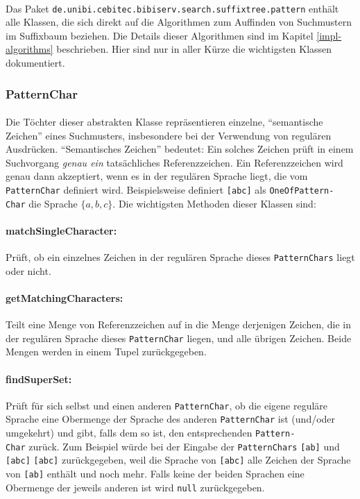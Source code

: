 \paragraph{} Das Paket \texttt{de.unibi.cebitec.bibiserv.search.suffixtree.pattern} enthält alle Klassen, die sich direkt auf die Algorithmen zum Auffinden von Suchmustern im Suffixbaum beziehen. Die Details dieser Algorithmen sind im Kapitel \ref{impl-algorithms} beschrieben. Hier sind nur in aller Kürze die wichtigsten Klassen dokumentiert.

\subsubsection{PatternChar}

\paragraph{} Die Töchter dieser abstrakten Klasse repräsentieren einzelne, "`semantische Zeichen"' eines Suchmusters, insbesondere bei der Verwendung von regulären Ausdrücken. "`Semantisches Zeichen"' bedeutet: Ein solches Zeichen prüft in einem Suchvorgang \textit{genau ein} tatsächliches Referenzzeichen. Ein Referenzzeichen wird genau dann akzeptiert, wenn es in der regulären Sprache liegt, die vom \texttt{PatternChar} definiert wird. Beispielsweise definiert \texttt{[abc]} als \texttt{OneOfPattern-\\Char} die Sprache $\lbrace a, b,c\rbrace$. Die wichtigsten Methoden dieser Klassen sind:

\paragraph{matchSingleCharacter:} Prüft, ob ein einzelnes Zeichen in der regulären Sprache dieses \texttt{PatternChars} liegt oder nicht.

\paragraph{getMatchingCharacters:} Teilt eine Menge von Referenzzeichen auf in die Menge derjenigen Zeichen, die in der regulären Sprache dieses \texttt{PatternChar} liegen, und alle übrigen Zeichen. Beide Mengen werden in einem Tupel zurückgegeben.

\paragraph{findSuperSet:} Prüft für sich selbst und einen anderen \texttt{PatternChar}, ob die eigene reguläre Sprache eine Obermenge der Sprache des anderen \texttt{PatternChar} ist (und/oder umgekehrt) und gibt, falls dem so ist, den entsprechenden \texttt{Pattern-\\Char} zurück. Zum Beispiel würde bei der Eingabe der \texttt{PatternChars} \texttt{[ab]} und \texttt{[abc]} \texttt{[abc]} zurückgegeben, weil die Sprache von \texttt{[abc]} alle Zeichen der Sprache von \texttt{[ab]} enthält und noch mehr. Falls keine der beiden Sprachen eine Obermenge der jeweils anderen ist wird \texttt{null} zurückgegeben.

